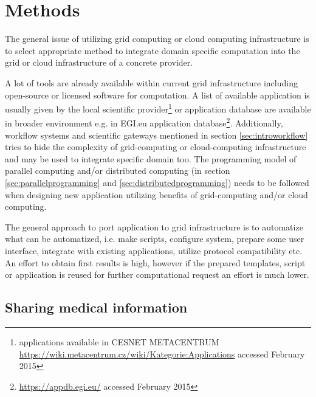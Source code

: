 \chapter{Methods}
\label{sec:methods}

The general issue of utilizing grid computing or cloud computing infrastructure is to select appropriate method to integrate domain specific computation into the grid or cloud infrastructure of a concrete provider. 

A lot of tools are already available within current grid infrastructure including open-source or licensed software for computation. A list of available application is usually given by the local scientific provider\footnote{applications available in CESNET METACENTRUM \url{https://wiki.metacentrum.cz/wiki/Kategorie:Applications} accessed February 2015} or application database are available in broader environment e.g. in EGI.eu application database\footnote{\url{https://appdb.egi.eu/} accessed February 2015}.
Additionally,  workflow systems and scientific gateways mentioned in section \ref{sec:introworkflow} tries to hide the complexity of grid-computing or cloud-computing infrastructure and may be used to integrate specific domain too.
The programming model of parallel computing and/or distributed  computing (in section \ref{sec:parallelprogramming} and  \ref{sec:distributedprogramming}) needs to be followed when designing new application utilizing benefits of grid-computing and/or cloud computing.

The general approach to port application to grid infrastructure is to automatize what can be automatized, i.e. make scripts, configure system, prepare some user interface, integrate with existing applications, utilize protocol compatibility etc. An effort to obtain first results is high, however if the prepared templates, script or application is reused for further computational request an effort is much lower.  

\section{Sharing medical information}
\label{sec:imaging}



